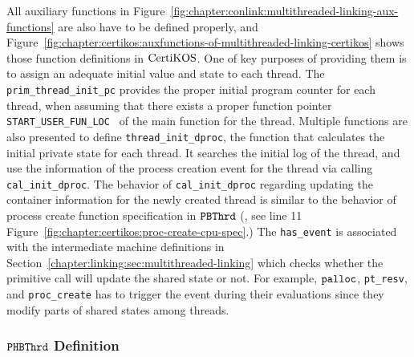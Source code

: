 All auxiliary functions in Figure~\ref{fig:chapter:conlink:multithreaded-linking-aux-functions} are also have to be defined 
properly, and Figure~\ref{fig:chapter:certikos:auxfunctions-of-multithreaded-linking-certikos} shows
those function definitions in $\mathrm{CertiKOS}$. 
One of key purposes of providing them is to assign an adequate initial value and state to each thread.
The \lstinline$prim_thread_init_pc$ provides the proper initial program counter for each thread, 
when assuming that there exists a proper function pointer \lstinline$START_USER_FUN_LOC $ 
of the main function for the thread.
Multiple functions are also presented to define \lstinline$thread_init_dproc$, the function that calculates the initial private state for each thread. 
It searches the initial log of the thread, and 
use the information of the process creation event  for the thread via
calling \lstinline$cal_init_dproc$.
The behavior of \lstinline$cal_init_dproc$ regarding updating the container information for the newly created thread is similar to the behavior 
of process create function specification in ${{\mathrm{\texttt{PBThrd}}}}$ (\ie, 
see line 11
Figure~\ref{fig:chapter:certikos:proc-create-cpu-spec}.)
The \lstinline$has_event$ is associated with the intermediate machine definitions in Section~\ref{chapter:linking:sec:multithreaded-linking}
which checks 
whether the primitive call will update the shared state or not.
For example, ${\mathrm{\texttt{palloc}}}$, \lstinline$pt_resv$, and \lstinline$proc_create$ has to 
trigger the event during their evaluations since they modify parts of shared states
among threads.



\subsubsection{${{\mathrm{\texttt{PHBThrd}}}}$ Definition}


